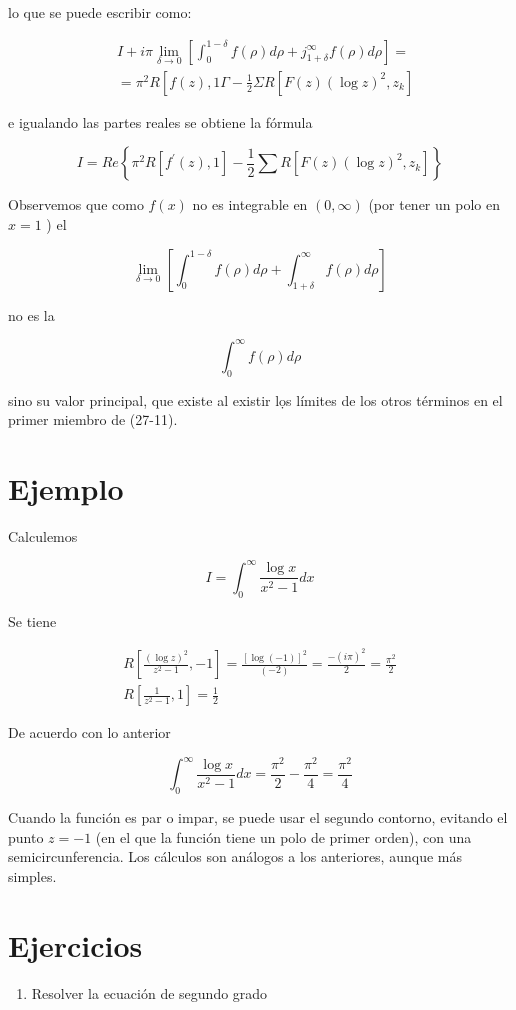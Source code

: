 \documentclass[10pt]{article}
\theoremstyle{plain}
\theoremstyle{definition}
\theoremstyle{remark}
\begin{document}
lo que se puede escribir como:

$$
\begin{aligned}
& I+i \pi \lim _{\delta \rightarrow 0}\left[\int_{0}^{1-\delta} f(\rho) d \rho+j_{1+\delta}^{\infty} f(\rho) d \rho\right]= \\
& =\pi^{2} R\left[f(z), 1 \Gamma-\frac{1}{2} \Sigma R\left[F(z)(\log z)^{2}, z_{k}\right]\right.
\end{aligned}
$$

e igualando las partes reales se obtiene la fórmula

$$
I=R e\left\{\pi^{2} R\left[f^{\prime}(z), 1\right]-\frac{1}{2} \sum R\left[F(z)(\log z)^{2}, z_{k}\right]\right\}
$$

Observemos que como $f(x)$ no es integrable en $(0, \infty)$ (por tener un polo en $x=1$ ) el

$$
\lim _{\delta \rightarrow 0}\left[\int_{0}^{1-\delta} f(\rho) d \rho+\int_{1+\delta}^{\infty} f(\rho) d \rho\right]
$$

no es la

$$
\int_{0}^{\infty} f(\rho) d \rho
$$

sino su valor principal, que existe al existir lọs límites de los otros términos en el primer miembro de (27-11).

\section*{Ejemplo}
Calculemos

$$
I=\int_{0}^{\infty} \frac{\log x}{x^{2}-1} d x
$$

Se tiene

$$
\begin{gathered}
R\left[\frac{(\log z)^{2}}{z^{2}-1},-1\right]=\frac{[\log (-1)]^{2}}{(-2)}=\frac{-(i \pi)^{2}}{2}=\frac{\pi^{2}}{2} \\
R\left[\frac{1}{z^{2}-1}, 1\right]=\frac{1}{2}
\end{gathered}
$$

De acuerdo con lo anterior

$$
\int_{0}^{\infty} \frac{\log x}{x^{2}-1} d x=\frac{\pi^{2}}{2}-\frac{\pi^{2}}{4}=\frac{\pi^{2}}{4}
$$

Cuando la función es par o impar, se puede usar el segundo contorno, evitando el punto $z=-1$ (en el que la función tiene un polo de primer orden), con una semicircunferencia. Los cálculos son análogos a los anteriores, aunque más simples.

\section*{Ejercicios}
\begin{enumerate}
  \item Resolver la ecuación de segundo grado
\end{enumerate}
\end{document}
